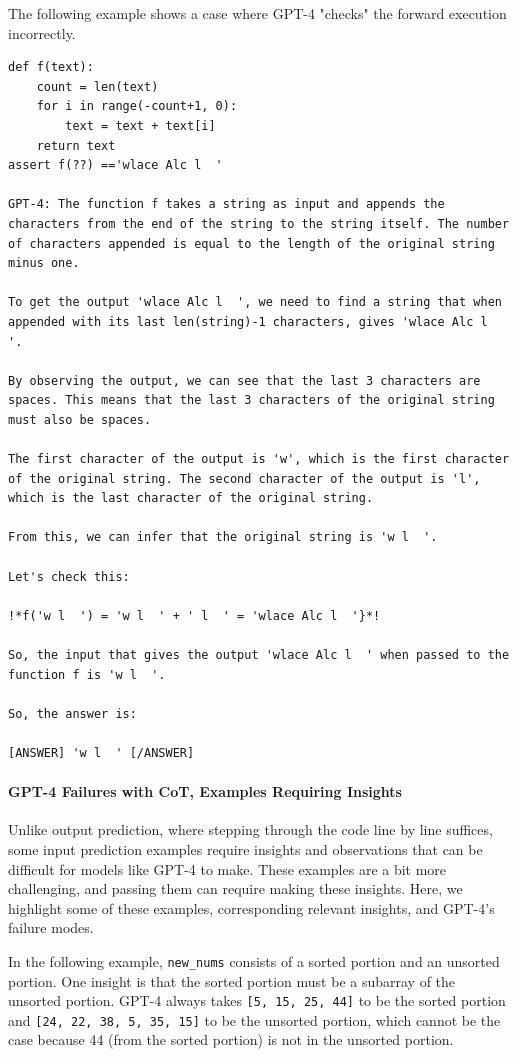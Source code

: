 The following example shows a case where GPT-4 "checks" the forward execution incorrectly.
\begin{lstlisting}
def f(text):
    count = len(text)
    for i in range(-count+1, 0):
        text = text + text[i]
    return text
assert f(??) =='wlace Alc l  '

GPT-4: The function f takes a string as input and appends the characters from the end of the string to the string itself. The number of characters appended is equal to the length of the original string minus one. 

To get the output 'wlace Alc l  ', we need to find a string that when appended with its last len(string)-1 characters, gives 'wlace Alc l  '. 

By observing the output, we can see that the last 3 characters are spaces. This means that the last 3 characters of the original string must also be spaces. 

The first character of the output is 'w', which is the first character of the original string. The second character of the output is 'l', which is the last character of the original string. 

From this, we can infer that the original string is 'w l  '. 

Let's check this:

!*f('w l  ') = 'w l  ' + ' l  ' = 'wlace Alc l  '}*!

So, the input that gives the output 'wlace Alc l  ' when passed to the function f is 'w l  '. 

So, the answer is:

[ANSWER] 'w l  ' [/ANSWER]
\end{lstlisting}

\paragraph{GPT-4 Failures with CoT, Examples Requiring Insights}
Unlike output prediction, where stepping through the code line by line suffices, some input prediction examples require insights and observations that can be difficult for models like GPT-4 to make. These examples are a bit more challenging, and passing them can require making these insights. Here, we highlight some of these examples, corresponding relevant insights, and GPT-4's failure modes.

In the following example, \texttt{new\_nums} consists of a sorted portion and an unsorted portion. One insight is that the sorted portion must be a subarray of the unsorted portion. GPT-4 always takes \texttt{[5, 15, 25, 44]} to be the sorted portion and \texttt{[24, 22, 38, 5, 35, 15]} to be the unsorted portion, which cannot be the case because 44 (from the sorted portion) is not in the unsorted portion.


